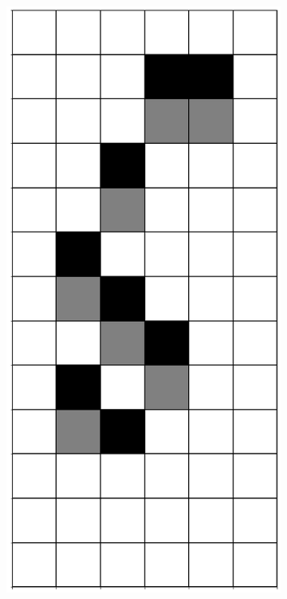 \documentclass[12pt]{article}
\numberwithin{figure}{section} %
\begin{document}
\begin{figure}[H]
\begin{subfigure}{0.3\textwidth}
     		\subcaption{}
   	\end{subfigure}
        \begin{subfigure}{0.3\textwidth}
     		\centering
     		\includegraphics[angle=270,width=\linewidth]{Section4/11.2}

\end{subfigure}
\end{figure}
\end{document}
